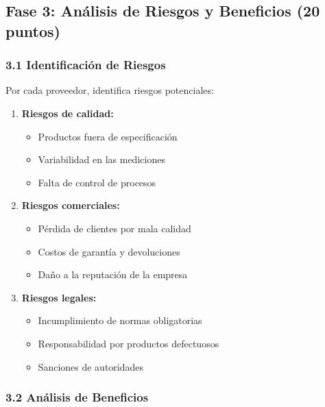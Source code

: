 \documentclass{article}
\begin{document}
\subsection*{Fase 3: Análisis de Riesgos y Beneficios (20 puntos)}

\subsubsection*{3.1 Identificación de Riesgos}

Por cada proveedor, identifica riesgos potenciales:
\begin{enumerate}
    \item \textbf{Riesgos de calidad:}
    \begin{itemize}
        \item Productos fuera de especificación
        \item Variabilidad en las mediciones
        \item Falta de control de procesos
    \end{itemize}
    \item \textbf{Riesgos comerciales:}
    \begin{itemize}
        \item Pérdida de clientes por mala calidad
        \item Costos de garantía y devoluciones
        \item Daño a la reputación de la empresa
    \end{itemize}
    \item \textbf{Riesgos legales:}
    \begin{itemize}
        \item Incumplimiento de normas obligatorias
        \item Responsabilidad por productos defectuosos
        \item Sanciones de autoridades
    \end{itemize}
\end{enumerate}

\subsubsection*{3.2 Análisis de Beneficios}
\end{document}
